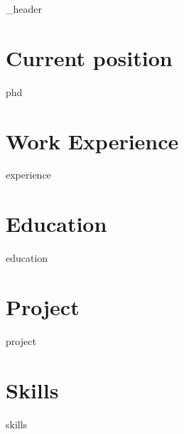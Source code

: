 \documentclass[a4,11pt]{article}
\author{Tomas Fiers}
\begin{document}
{_header}
\vspace*{10pt}

\section{Current position}
{phd}
\vspace*{10pt}

\section{Work Experience}
{experience}
\vspace*{10pt}

\section{Education}
{education}
\vspace*{10pt}

\section{Project}
\vspace*{3pt}
{project}
\vspace*{10pt}

\section{Skills}
\vspace*{3pt}
{skills}
\vspace*{10pt}
\end{document}

